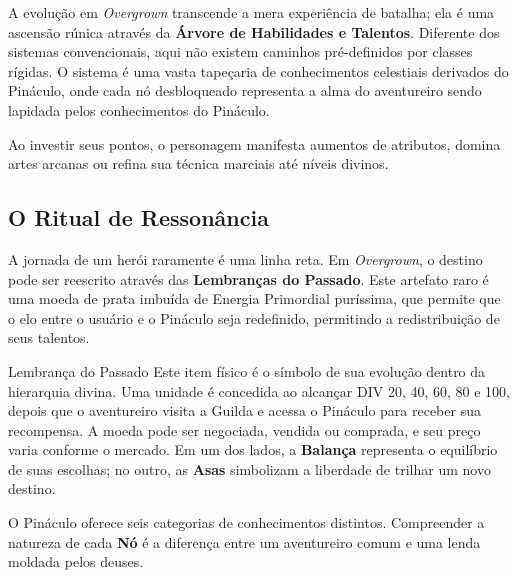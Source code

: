 

A evolução em \textit{Overgrown} transcende a mera experiência de batalha; ela é uma ascensão rúnica através da \textbf{Árvore de Habilidades e Talentos}. Diferente dos sistemas convencionais, aqui não existem caminhos pré-definidos por classes rígidas. O sistema é uma vasta tapeçaria de conhecimentos celestiais derivados do Pináculo, onde cada nó desbloqueado representa a alma do aventureiro sendo lapidada pelos conhecimentos do Pináculo.

Ao investir seus pontos, o personagem manifesta aumentos de atributos, domina artes arcanas ou refina sua técnica marciais até níveis divinos.

\subsection*{O Ritual de Ressonância}
A jornada de um herói raramente é uma linha reta. Em \textit{Overgrown}, o destino pode ser reescrito através das \textbf{Lembranças do Passado}. Este artefato raro é uma moeda de prata imbuída de Energia Primordial puríssima, que permite que o elo entre o usuário e o Pináculo seja redefinido, permitindo a redistribuição de seus talentos.

\begin{rpgboxtips}{Lembrança do Passado}
Este item físico é o símbolo de sua evolução dentro da hierarquia divina. Uma unidade é concedida ao alcançar DIV 20, 40, 60, 80 e 100, depois que o aventureiro visita a Guilda e acessa o Pináculo para receber sua recompensa. A moeda pode ser negociada, vendida ou comprada, e seu preço varia conforme o mercado. Em um dos lados, a \textbf{Balança} representa o equilíbrio de suas escolhas; no outro, as \textbf{Asas} simbolizam a liberdade de trilhar um novo destino.
\end{rpgboxtips}

O Pináculo oferece seis categorias de conhecimentos distintos. Compreender a natureza de cada \textbf{Nó} é a diferença entre um aventureiro comum e uma lenda moldada pelos deuses.

